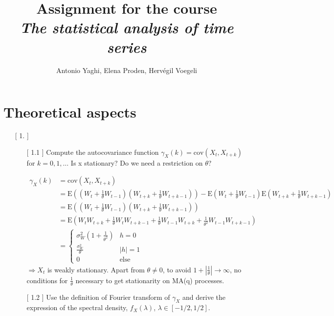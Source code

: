 \documentclass[10pt,a4paper]{article}
\author{ Antonio Yaghi, Elena Proden, Hervégil Voegeli}
\title{Assignment for the course \\ \textit{The statistical analysis of time series}}
\begin{document}
	\maketitle
	\newpage
	\section{Theoretical aspects}
	\begin{enumerate}
	\item[[ 1.]] \begin{enumerate}
			\item[[ 1.1]] Compute the autocovariance function $\gamma_{X} (k) = \text{cov}(X_t,X_{t+k})$ for $k=0,1,\dots$ Is { \selectfont \large  x } stationary? Do we need a restriction on $\theta$?
			
			\begin{align*}
				\gamma_{X}(k) &= \text{cov}(X_t,X_{t+k}) \\
				&= \text{E}((W_t+\frac{1}{\theta} W_{t-1})(W_{t+k}+\frac{1}{\theta}W_{t+k-1})) - \text{E}(W_t+\frac{1}{\theta} W_{t-1})\text{E}(W_{t+k}+\frac{1}{\theta}W_{t+k-1}) \\
				&= \text{E}((W_t+\frac{1}{\theta} W_{t-1})(W_{t+k}+\frac{1}{\theta}W_{t+k-1})) \\
				&= \text{E}(W_tW_{t+k} + \frac{1}{\theta} W_tW_{t+k-1}+\frac{1}{\theta} W_{t-1}W_{t+k} + \frac{1}{\theta^2} W_{t-1}W_{t+k-1}) \\
				&= 	\left\{
							\begin{array}{ll}
								\sigma^2_{W} (1+\frac{1}{\theta^2}) & h=0\\
								\frac{\sigma^2_{W}}{\theta} & |h|=1\\
								0 & \text{else}
							\end{array}
					\right.			
			\end{align*}		
			$\Rightarrow X_{t}$ is weakly stationary.\newline
			Apart from $\theta \neq 0$, to avoid $1+|\frac{1}{\theta}|  \rightarrow \infty$, no conditions for $\frac{1}{\theta}$ necessary to get stationarity on MA(q) processes.
			
			
			
			\item[[ 1.2]] Use the definition of Fourier transform of $\gamma_X$ and derive the expression of the spectral density, $f_X(\lambda)$, $\lambda \in \left[-1/2,1/2\right]$.
			

\end{enumerate}
\end{enumerate}
\end{document}

